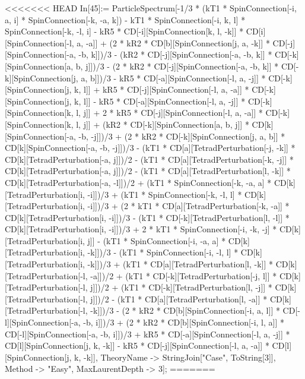 <<<<<<< HEAD
In[45]:= ParticleSpectrum[-1/3 * (kT1 * SpinConnection[-i, a, i] * SpinConnection[-k, -a, k]) - kT1 * SpinConnection[-i, k, l] * SpinConnection[-k, -l, i] - kR5 * CD[-i][SpinConnection[k, l, -k]] * CD[i][SpinConnection[-l, a, -a]] + (2 * kR2 * CD[b][SpinConnection[j, a, -k]] * CD[-j][SpinConnection[-a, -b, k]])/3 - (kR2 * CD[-j][SpinConnection[-a, -b, k]] * CD[-k][SpinConnection[a, b, j]])/3 - (2 * kR2 * CD[-j][SpinConnection[-a, -b, k]] * CD[-k][SpinConnection[j, a, b]])/3 - kR5 * CD[-a][SpinConnection[-l, a, -j]] * CD[-k][SpinConnection[j, k, l]] + kR5 * CD[-j][SpinConnection[-l, a, -a]] * CD[-k][SpinConnection[j, k, l]] - kR5 * CD[-a][SpinConnection[-l, a, -j]] * CD[-k][SpinConnection[k, l, j]] + 2 * kR5 * CD[-j][SpinConnection[-l, a, -a]] * CD[-k][SpinConnection[k, l, j]] + (kR2 * CD[-k][SpinConnection[a, b, j]] * CD[k][SpinConnection[-a, -b, -j]])/3 + (2 * kR2 * CD[-k][SpinConnection[j, a, b]] * CD[k][SpinConnection[-a, -b, -j]])/3 - (kT1 * CD[a][TetradPerturbation[-j, -k]] * CD[k][TetradPerturbation[-a, j]])/2 - (kT1 * CD[a][TetradPerturbation[-k, -j]] * CD[k][TetradPerturbation[-a, j]])/2 - (kT1 * CD[a][TetradPerturbation[l, -k]] * CD[k][TetradPerturbation[-a, -l]])/2 + (kT1 * SpinConnection[-k, -a, a] * CD[k][TetradPerturbation[i, -i]])/3 + (kT1 * SpinConnection[-k, -l, l] * CD[k][TetradPerturbation[i, -i]])/3 + (2 * kT1 * CD[a][TetradPerturbation[-k, -a]] * CD[k][TetradPerturbation[i, -i]])/3 - (kT1 * CD[-k][TetradPerturbation[l, -l]] * CD[k][TetradPerturbation[i, -i]])/3 + 2 * kT1 * SpinConnection[-i, -k, -j] * CD[k][TetradPerturbation[i, j]] - (kT1 * SpinConnection[-i, -a, a] * CD[k][TetradPerturbation[i, -k]])/3 - (kT1 * SpinConnection[-i, -l, l] * CD[k][TetradPerturbation[i, -k]])/3 + (kT1 * CD[a][TetradPerturbation[l, -k]] * CD[k][TetradPerturbation[-l, -a]])/2 + (kT1 * CD[-k][TetradPerturbation[-j, l]] * CD[k][TetradPerturbation[-l, j]])/2 + (kT1 * CD[-k][TetradPerturbation[l, -j]] * CD[k][TetradPerturbation[-l, j]])/2 - (kT1 * CD[a][TetradPerturbation[l, -a]] * CD[k][TetradPerturbation[-l, -k]])/3 - (2 * kR2 * CD[b][SpinConnection[-i, a, l]] * CD[-l][SpinConnection[-a, -b, i]])/3 + (2 * kR2 * CD[b][SpinConnection[-i, l, a]] * CD[-l][SpinConnection[-a, -b, i]])/3 + kR5 * CD[-a][SpinConnection[-l, a, -j]] * CD[l][SpinConnection[j, k, -k]] - kR5 * CD[-j][SpinConnection[-l, a, -a]] * CD[l][SpinConnection[j, k, -k]], TheoryName -> StringJoin["Case", ToString[3]], Method -> "Easy", MaxLaurentDepth -> 3]; 
=======
